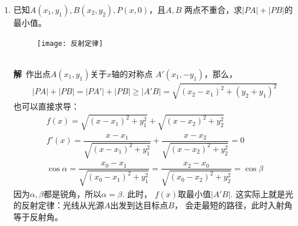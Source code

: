 \begin{enumerate}[label={【\textbf{例\thechapter.\arabic*}】},
 leftmargin=\inteval{\myenumleftmargin}pt,
 itemsep=\inteval{\myenumitempsep}pt,
 itemindent=\inteval{\myenumitemindent}pt]
\item 已知$ A(x_1,y_1),B(x_2,y_2),P(x,0) $，且$ A,B $
两点不重合，求$ |PA|+|PB| $的最小值。
\begin{figure}[h]
    \centering
    \texttt{[image: 反射定律]}
\end{figure}  \\
\textbf{解}\ 作出点$ A(x_1,y_1) $关于$ x $轴的对称点
$ A'(x_1,-y_1) $，那么，
\begin{align*}
    |PA|+|PB|=|PA'|+|PB|\geq |A'B|=\sqrt{(x_2-x_1)^2+(y_2+y_1)^2}
\end{align*}
也可以直接求导：
\begin{gather*}
    f(x)=\sqrt{(x-x_1)^2+y_1^2}+\sqrt{(x-x_2)^2+y_2^2} \\
    f'(x)=\dfrac{x-x_1}{\sqrt{(x-x_1)^2+y_1^2}}+
    \dfrac{x-x_2}{\sqrt{(x-x_2)^2+y_2^2}}=0  \\
    \cos \alpha=\dfrac{x_0-x_1}{\sqrt{(x_0-x_1)^2+y_1^2}}=
    \dfrac{x_2-x_0}{\sqrt{(x_0-x_2)^2+y_2^2}} =\cos \beta
\end{gather*}
因为$ \alpha,\beta $都是锐角，所以$ \alpha=\beta $. 此时，
$ f(x) $取最小值$ |A'B| $.
这实际上就是光的反射定律：光线从光源$ A $出发到达目标点$ B $，
会走最短的路径，此时入射角等于反射角。


\end{enumerate}
